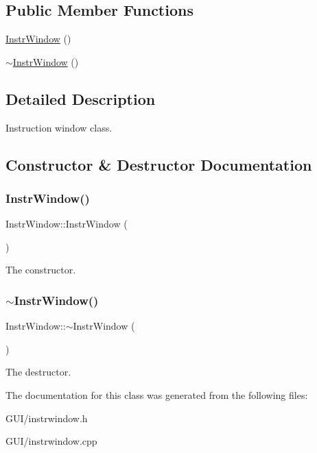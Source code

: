 \subsection*{Public Member Functions}
\begin{DoxyCompactItemize}
\item 
\hyperlink{classInstrWindow_a4d425c2334a77bdc9e3f0aa91e691909}{Instr\+Window} ()
\item 
\hyperlink{classInstrWindow_a192ae02056142b9567d9c87c0708f7a5}{$\sim$\+Instr\+Window} ()
\end{DoxyCompactItemize}


\subsection{Detailed Description}
Instruction window class. 

\subsection{Constructor \& Destructor Documentation}
\mbox{\label{classInstrWindow_a4d425c2334a77bdc9e3f0aa91e691909}} 
\subsubsection{\texorpdfstring{Instr\+Window()}{InstrWindow()}}
{\footnotesize\ttfamily Instr\+Window\+::\+Instr\+Window (\begin{DoxyParamCaption}{ }\end{DoxyParamCaption})}

The constructor. \mbox{\label{classInstrWindow_a192ae02056142b9567d9c87c0708f7a5}} 
\subsubsection{\texorpdfstring{$\sim$\+Instr\+Window()}{~InstrWindow()}}
{\footnotesize\ttfamily Instr\+Window\+::$\sim$\+Instr\+Window (\begin{DoxyParamCaption}{ }\end{DoxyParamCaption})}

The destructor. 

The documentation for this class was generated from the following files\+:\begin{DoxyCompactItemize}
\item 
G\+U\+I/instrwindow.\+h\item 
G\+U\+I/instrwindow.\+cpp\end{DoxyCompactItemize}
